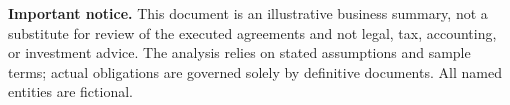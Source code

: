 \vfill
{\scriptsize\color{muted}
\textbf{Important notice.} This document is an illustrative business summary, not a substitute for review of the executed agreements and not legal, tax, accounting, or investment advice. The analysis relies on stated assumptions and sample terms; actual obligations are governed solely by definitive documents. All named entities are fictional.}
\vspace{14pt}
